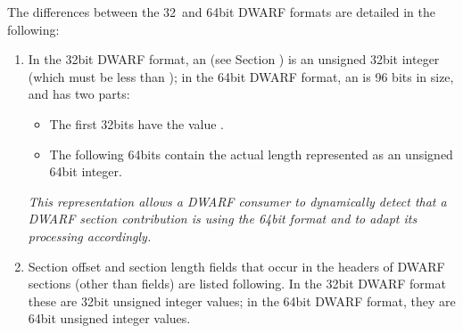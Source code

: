 The differences between the 32\dash\   and 64\dash bit 
DWARF formats are
detailed in the following:
\begin{enumerate}[1. ]

\item  In the 32\dash bit DWARF format, an 
(see 
Section ) 
is an unsigned 32\dash bit integer (which
must be less than \xfffffffzero); in the 64\dash bit DWARF format,
an  is 96 bits in size,
and has two parts:
\begin{itemize}
\item The first 32\dash bits have the value \xffffffff.

\item  The following 64\dash bits contain the actual length
represented as an unsigned 64\dash bit integer.
\end{itemize}

\textit{This representation allows a DWARF consumer to dynamically
detect that a DWARF section contribution is using the 64\dash bit
format and to adapt its processing accordingly.}

\item Section offset and section length
\hypertarget{datarep:sectionoffsetlength}{} 
fields that occur
in the headers of DWARF sections (other 
than 
fields) are listed following. In the 32\dash bit DWARF format these
are 32\dash bit unsigned integer values; in the 64\dash bit DWARF format,
they 
are 
64\dash bit 
unsigned integer values.


\end{enumerate}
